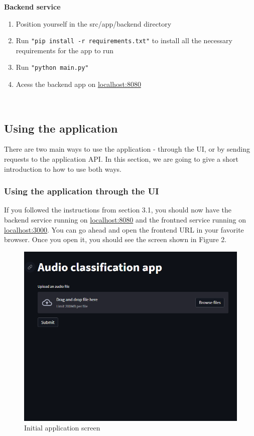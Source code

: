 \documentclass{ol-softwaremanual}
\begin{document}
 \noindent \textbf{Backend service}

\begin{enumerate}
\item Position yourself in the src/app/backend directory
\item Run \texttt{"pip install -r requirements.txt"} to install all the necessary requirements for the app to run
\item Run \texttt{"python main.py"}
\item Acess the backend app on \url{localhost:8080}
\end{enumerate} \\

\subsection{Using the application}

There are two main ways to use the application - through the UI, or by sending requests to the application API. In this section, we are going to give a short introduction to how to use both ways.

\subsubsection{Using the application through the UI}

If you followed the instructions from section 3.1, you should now have the backend service running on \url{localhost:8080} and the frontned service running on \url{localhost:3000}. You can go ahead and open the frontend URL in your favorite browser. Once you open it, you should see the screen shown in Figure 2. 

\begin{figure}[H]
\centering
\includegraphics[width=1.0\textwidth]{images/app_1.png}
\caption{\label{fig:wandb}Initial application screen}
\end{figure}
\end{document}
